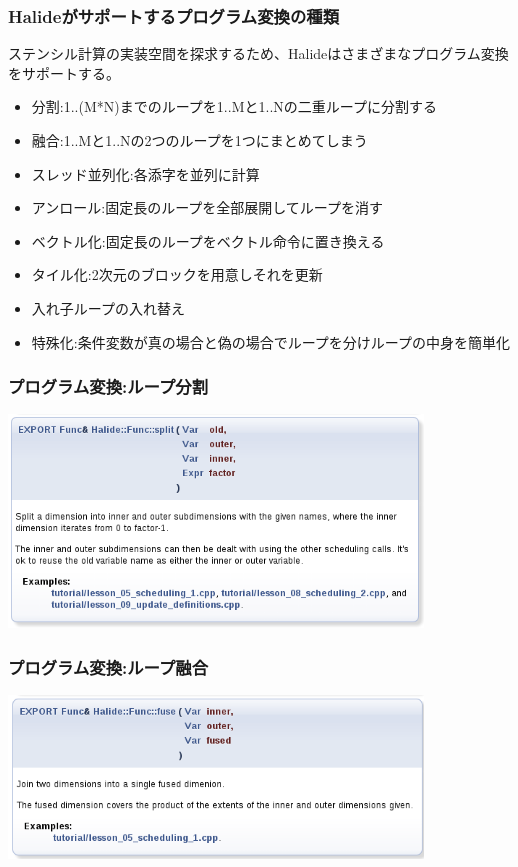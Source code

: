 \documentclass[dvipdfmx,cjk]{beamer}
\begin{document}
\begin{frame}\frametitle{Halideがサポートするプログラム変換の種類}

ステンシル計算の実装空間を探求するため、Halideはさまざまなプログラム変換をサポートする。

\begin{itemize}
  \item 分割:1..(M*N)までのループを1..Mと1..Nの二重ループに分割する
  \item 融合:1..Mと1..Nの2つのループを1つにまとめてしまう
  \item スレッド並列化:各添字を並列に計算
  \item アンロール:固定長のループを全部展開してループを消す
  \item ベクトル化:固定長のループをベクトル命令に置き換える
  \item タイル化:2次元のブロックを用意しそれを更新
  \item 入れ子ループの入れ替え
  \item 特殊化:条件変数が真の場合と偽の場合でループを分けループの中身を簡単化
\end{itemize}
\end{frame}

\begin{frame}\frametitle{プログラム変換:ループ分割}
\begin{center}\includegraphics[width=11cm]{figure/doc/schedule-split.png}\end{center}\end{frame}

\begin{frame}\frametitle{プログラム変換:ループ融合}
\begin{center}\includegraphics[width=11cm]{figure/doc/schedule-fuse.png}\end{center}\end{frame}
\end{document}
